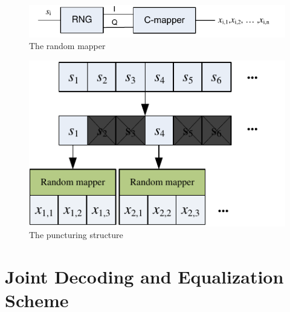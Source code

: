 \documentclass[conference]{IEEEtran}
\begin{document}
%
%
\begin{figure}[ht]
\centering
\includegraphics[width=0.9\columnwidth]{mapper.pdf}
\caption{The random mapper}
\label{fig_mapper}
\end{figure}
\begin{figure}[ht]
\centering
\includegraphics[width=3 in]{punturing.pdf}
\caption{The puncturing structure}
\label{fig_puncturing}
\end{figure}



\section{Joint Decoding and Equalization Scheme} \label{sec:jointEqualization}
\end{document}
